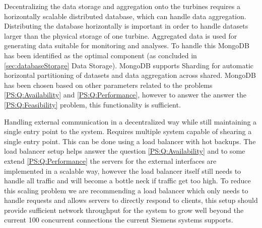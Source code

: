 Decentralizing the data storage and aggregation onto the turbines requires a horizontally scalable distributed database, which can handle data aggregation.
Distributing the database horizontally is important in order to handle datasets larger than the physical storage of one turbine.
Aggregated data is used for generating data suitable for monitoring and analyses.
To handle this MongoDB~\cite{mongodb} has been identified as the optimal component (as concluded in \cref{sec:databaseStorage} Data Storage). MongoDB supports Sharding for automatic horizontal partitioning of datasets and data aggregation across shared. MongoDB has been chosen based on other parameters related to the problems \ref{PS:Q:Availability} and \ref{PS:Q:Performance}, however to answer the answer the \ref{PS:Q:Feasibility} problem, this functionality is sufficient. 

Handling external communication in a decentralized way while still maintaining a single entry point to the system.
Requires multiple system capable of shearing a single entry point.
This can be done using a load balancer with hot backups.
The load balancer setup helps answer the question \ref{PS:Q:Availability} and to some extend \ref{PS:Q:Performance} the servers for the external interfaces are implemented in a scalable way, however the load balancer itself still needs to handle all traffic and will become a bottle neck if traffic get too high.
To reduce this scaling problem we are recommending a load balancer which only needs to handle requests and allows servers to directly respond to clients, this setup should provide sufficient network throughput for the system to grow well beyond the current 100 concurrent connections the current Siemens systems supports.
\clearpage
